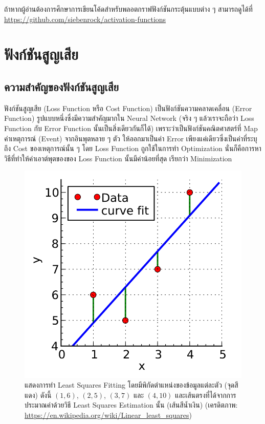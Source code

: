 ถ้าหากผู้อ่านต้องการศึกษาการเขียนโค้ดสำหรับพลอตกราฟฟังก์ชันกระตุ้นแบบต่าง ๆ สามารถดูได้ที่ 
\url{https://github.com/siebenrock/activation-functions}

\section{ฟังก์ชันสูญเสีย}
\label{sec:loss_func}

\subsection{ความสำคัญของฟังก์ชันสูญเสีย}

ฟังก์ชันสูญเสีย (Loss Function หรือ Cost Function) เป็นฟังก์ชันความคลาดเคลื่อน (Error Function) รูปแบบหนึ่งซึ่งมีความสำคัญมากใน 
Neural Network (จริง ๆ แล้วเราจะถือว่า Loss Function กับ Error Function นั้นเป็นสิ่งเดียวกันก็ได้) เพราะว่าเป็นฟังก์ชันคณิตศาสตร์ที่ 
Map ค่าเหตุการณ์ (Event) จากอินพุตหลาย ๆ ตัว ให้ออกมาเป็นค่า Error เพียงแค่เดียวซึ่งเป็นค่าที่ระบุถึง Cost ของเหตุการณ์นั้น ๆ โดย Loss 
Function ถูกใช้ในการทำ Optimization นั่นก็คือการหาวิธีที่ทำให้ค่าเอาต์พุตของของ Loss Function นั้นมีค่าน้อยที่สุด เรียกว่า Minimization 

\begin{figure}[htbp]
    \centering
    \includegraphics[width=0.7\linewidth]{fig/least-squares-fitting.png}
    \caption{แสดงการทำ Least Squares Fitting โดยมีพิกัดตำแหน่งของข้อมูลแต่ละตัว (จุดสีแดง) ดังนี้ $(1,6)$, $(2,5)$, $(3,7)$ 
    และ $(4,10)$ และเส้นตรงที่ได้จากการประมาณค่าด้วยวิธี Least Squares Estimation นั้น (เส้นสีน้ำเงิน) (เครดิตภาพ: 
    \url{https://en.wikipedia.org/wiki/Linear_least_squares})}
    \label{fig:least_square_fitting}
\end{figure}


